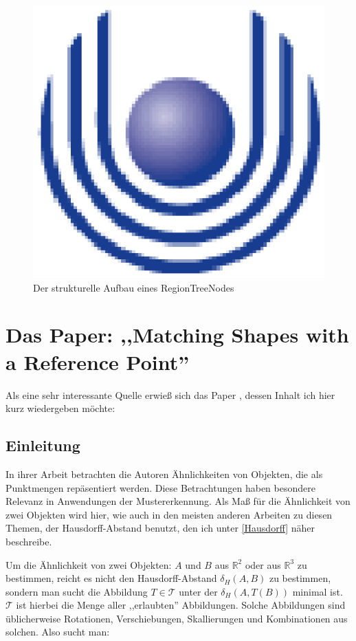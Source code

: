 \begin{figure}
	\centering
	\includegraphics{feu_logo2.eps}
	\caption{Der strukturelle Aufbau eines RegionTreeNodes}
	\label{fig:RegionTreeNode}
\end{figure}

\section[Matching Shapes with a Reference Point]{Das Paper: ,,Matching Shapes with a Reference Point'' }\label{AARR}

Als eine sehr interessante Quelle erwieß sich das Paper \cite{AAR}, dessen Inhalt ich hier kurz wiedergeben möchte:

\subsection{Einleitung}

In ihrer Arbeit betrachten die Autoren Ähnlichkeiten von Objekten, die als Punktmengen repäsentiert werden. Diese Betrachtungen haben besondere Relevanz in Anwendungen der Mustererkennung. Als Maß für die Ähnlichkeit von zwei Objekten wird hier, wie auch in den meisten anderen Arbeiten zu diesen Themen, der Hausdorff-Abstand benutzt, den ich unter \ref{Hausdorff} näher beschreibe.

Um die Ähnlichkeit von zwei Objekten: $A$ und $B$ aus $\mathbb{R}^2$ oder aus $\mathbb{R}^3$ zu bestimmen, reicht es nicht den Hausdorff-Abstand $\delta_H(A,B)$ zu bestimmen, sondern man sucht die Abbildung $T\in\mathcal{T}$ unter der $\delta_H(A,T(B))$ minimal ist. $\mathcal{T}$ ist hierbei die Menge aller ,,erlaubten'' Abbildungen. Solche Abbildungen sind üblicherweise Rotationen, Verschiebungen, Skallierungen und Kombinationen aus solchen. Also sucht man:

